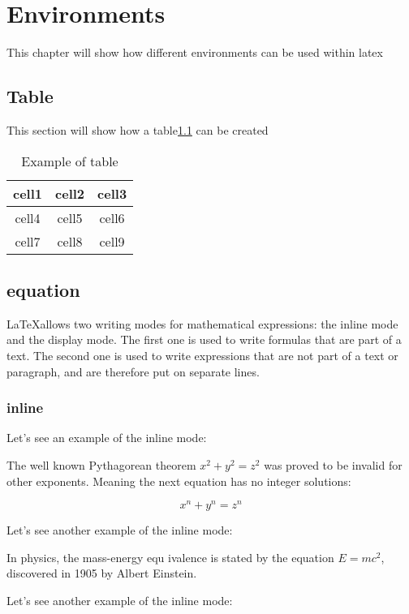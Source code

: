 \chapter{Environments}

This chapter will show how different environments can be used within latex 
\section{Table}


This section will show how a table\ref{egtab} can be created 

\begin{table}[h]
\begin{center}
\caption{Example of table}
\label{egtab}
\begin{tabular}{ |c|c|c| } 
 \hline
  \textbf{cell1} & cell2 & cell3 \\ \hline 
  cell4 & cell5 & cell6 \\ \hline
  cell7 & cell8 & cell9 \\ 
 \hline
\end{tabular}
\end{center}
\end{table}


\section{equation}

\LaTeX allows two writing modes for mathematical expressions: the inline mode and the display mode. The first one is used to write formulas that are part of a text. The second one is used to write expressions that are not part of a text or paragraph, and are therefore put on separate lines.
\subsection{inline}
Let's see an example of the inline mode: 

The well known Pythagorean theorem \(x^2 + y^2 = z^2\) was 
proved to be invalid for other exponents. 
Meaning the next equation has no integer solutions:
 
\[ x^n + y^n = z^n \]

Let's see another example of the inline mode:

In physics, the mass-energy equ
ivalence is stated 
by the equation $E=mc^2$, discovered in 1905 by Albert Einstein.


Let's see another example of the inline mode:

